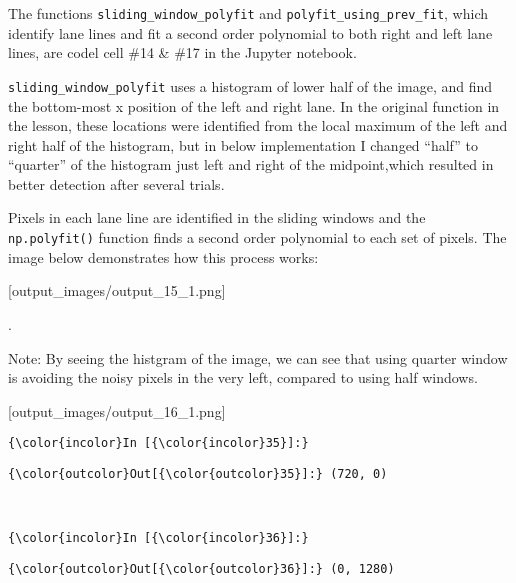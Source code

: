 \documentclass[11pt]{article}
\begin{document}
The functions \texttt{sliding\_window\_polyfit} and
\texttt{polyfit\_using\_prev\_fit}, which identify lane lines and fit a
second order polynomial to both right and left lane lines, are codel
cell \#14 \& \#17 in the Jupyter notebook.

\texttt{sliding\_window\_polyfit} uses a histogram of lower half of the
image, and find the bottom-most x position of the left and right lane.
In the original function in the lesson, these locations were identified
from the local maximum of the left and right half of the histogram, but
in below implementation I changed ``half'' to ``quarter'' of the
histogram just left and right of the midpoint,which resulted in better
detection after several trials.

Pixels in each lane line are identified in the sliding windows and the
\texttt{np.polyfit()} function finds a second order polynomial to each
set of pixels. The image below demonstrates how this process works:

{[}output\_images/output\_15\_1.png{]}

.

Note: By seeing the histgram of the image, we can see that using quarter
window is avoiding the noisy pixels in the very left, compared to using
half windows.

{[}output\_images/output\_16\_1.png{]}

    \begin{Verbatim}[commandchars=\\\{\}]
{\color{incolor}In [{\color{incolor}35}]:} 
\end{Verbatim}


\begin{Verbatim}[commandchars=\\\{\}]
{\color{outcolor}Out[{\color{outcolor}35}]:} (720, 0)
\end{Verbatim}
            
    \begin{center}
    \end{center}
    { \hspace*{\fill} \\}
    
    \begin{Verbatim}[commandchars=\\\{\}]
{\color{incolor}In [{\color{incolor}36}]:} 
\end{Verbatim}


\begin{Verbatim}[commandchars=\\\{\}]
{\color{outcolor}Out[{\color{outcolor}36}]:} (0, 1280)
\end{Verbatim}
            
\end{document}
